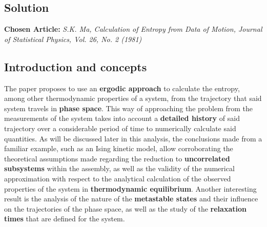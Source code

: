 \documentclass{article}
\begin{document}
\subsection*{Solution}
\textbf{Chosen Article: } \textit{S.K. Ma, Calculation of Entropy from Data of Motion, Journal of Statistical
Physics, Vol. 26, No. 2 (1981) } \cite{entropy_1981}
\subsection{Introduction and concepts}
The paper proposes to use an \textbf{ergodic approach} to calculate the entropy, among other thermodynamic properties of a system, from the trajectory that said system travels in \textbf{phase space}. This way of approaching the problem from the measurements of the system takes into account a \textbf{detailed history} of said trajectory over a considerable period of time to numerically calculate said quantities. As will be discussed later in this analysis, the conclusions made from a familiar example, such as an Ising kinetic model, allow corroborating the theoretical assumptions made regarding the reduction to \textbf{uncorrelated subsystems} within the assembly, as well as the validity of the numerical approximation with respect to the analytical calculation of the observed properties of the system in \textbf{thermodynamic equilibrium}. Another interesting result is the analysis of the nature of the \textbf{metastable states} and their influence on the trajectories of the phase space, as well as the study of the \textbf{relaxation times} that are defined for the system.
\end{document}

